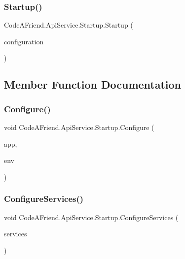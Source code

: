 \subsubsection{\texorpdfstring{Startup()}{Startup()}}
{\footnotesize\ttfamily Code\+A\+Friend.\+Api\+Service.\+Startup.\+Startup (\begin{DoxyParamCaption}\item[{I\+Configuration}]{configuration }\end{DoxyParamCaption})}



\subsection{Member Function Documentation}
\mbox{\label{class_code_a_friend_1_1_api_service_1_1_startup_a46281474c3b037d665db839d6bd65d04}} 
\subsubsection{\texorpdfstring{Configure()}{Configure()}}
{\footnotesize\ttfamily void Code\+A\+Friend.\+Api\+Service.\+Startup.\+Configure (\begin{DoxyParamCaption}\item[{I\+Application\+Builder}]{app,  }\item[{I\+Hosting\+Environment}]{env }\end{DoxyParamCaption})}

\mbox{\label{class_code_a_friend_1_1_api_service_1_1_startup_ad26fcb90bcdee4851b54c95afed4bfc1}} 
\subsubsection{\texorpdfstring{Configure\+Services()}{ConfigureServices()}}
{\footnotesize\ttfamily void Code\+A\+Friend.\+Api\+Service.\+Startup.\+Configure\+Services (\begin{DoxyParamCaption}\item[{I\+Service\+Collection}]{services }\end{DoxyParamCaption})}



